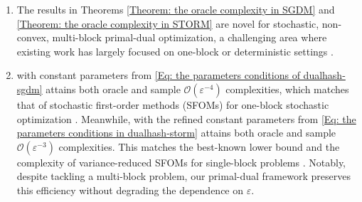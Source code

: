 \begin{remark}
\begin{enumerate}[label=(\roman*), leftmargin=2em]
\item The results in Theorems \ref{Theorem: the oracle complexity in SGDM} and \ref{Theorem: the oracle complexity in STORM} are novel for stochastic, non-convex, multi-block primal-dual optimization, a challenging area where existing work has largely focused on one-block \cite{xu2023momentum,shi2025momentum,tran2022hybrid} or deterministic settings \cite{ADMMNolinear2024}.  
    \item  {} with constant parameters from \eqref{Eq: the parameters conditions of dualhash-sgdm} attains both oracle and sample \(\mathcal{O}(\varepsilon^{-4})\) complexities, which matches that of stochastic first-order methods (SFOMs) for one-block stochastic optimization \cite{Ghadimi2013MinibatchSA}. Meanwhile,  with the refined constant parameters from \eqref{Eq: the parameters conditions in dualhash-storm} attains both oracle and sample $\mathcal{O}(\varepsilon^{-3})$ complexities. This matches the best-known lower bound \cite{arjevani2023lower} and the complexity of variance-reduced SFOMs for single-block problems \cite{shi2025momentum,xu2023momentum}. Notably, despite tackling a multi-block problem, our primal-dual framework preserves this efficiency without degrading the dependence on $\varepsilon$.
\end{enumerate}
\end{remark}

